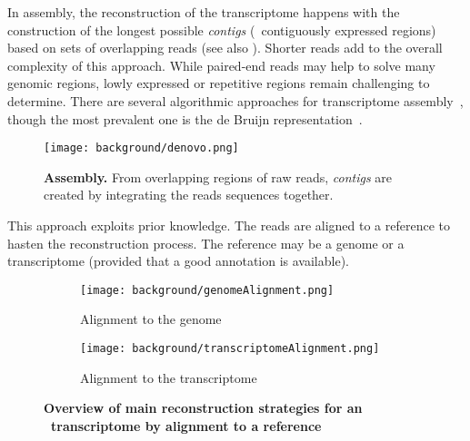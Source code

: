 In  assembly, the reconstruction of the transcriptome happens
with the construction of the longest possible \emph{contigs} (\ie\ contiguously
expressed regions) based on sets of overlapping reads (see also
). Shorter reads add
to the overall complexity of this approach. While paired-end reads may help to
solve many genomic regions, lowly expressed or repetitive regions remain
challenging to determine. There are several algorithmic approaches for  transcriptome assembly~,
though the most prevalent one is the de Bruijn representation~.\mybr\

\begin{figure}[!htb]
    \texttt{[image: background/denovo.png]}\centering
    \caption[\textit{de novo} Assembly]{\label{fig:denovo}\textbf{
    Assembly.} From overlapping regions of raw reads, \emph{contigs} are
    created by integrating the reads sequences together.}
\end{figure}

This approach exploits prior knowledge. The reads are aligned to a reference to
hasten the reconstruction process. The reference may be a genome or a
transcriptome (provided that a good annotation is available).\mybr\

\begin{figure}[!htb]
    \centering
    \begin{subfigure}{1.1\textwidth}\label{fig:genoAlignment}
        \texttt{[image: background/genomeAlignment.png]}\centering
        \caption{Alignment to the genome}
    \end{subfigure}

    \begin{subfigure}{1.1\textwidth}\label{fig:transAlignment}
        \texttt{[image: background/transcriptomeAlignment.png]}\centering
        \caption{Alignment to the transcriptome}
    \end{subfigure}
    \caption[Overview of main alignment strategies for \Rnaseq\
    transcriptome]{\label{fig:OverviewRnaseqMapping}\textbf{Overview of main
    reconstruction strategies for an \Rnaseq\ transcriptome by alignment to a
    reference}}
\end{figure}

